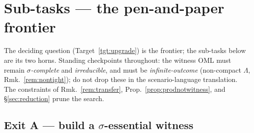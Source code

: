 \documentclass[11pt]{article}
\theoremstyle{definition}
\theoremstyle{remark}
\begin{document}
\section{Sub-tasks --- the pen-and-paper frontier}\label{sec:tasks}

The deciding question (Target~\ref{tgt:upgrade}) is the frontier; the sub-tasks below
are its two horns. Standing checkpoints throughout: the witness OML must remain
\emph{$\sigma$-complete} and \emph{irreducible}, and must be \emph{infinite-outcome}
(non-compact $\Lambda$, Rmk.~\ref{rem:nontight}); do not drop these in the
scenario-language translation. The constraints of Rmk.~\ref{rem:transfer},
Prop.~\ref{prop:prodnotwitness}, and \S\ref{sec:reduction} prune the search.

\subsection*{Exit A --- build a $\sigma$-essential witness}
\end{document}
